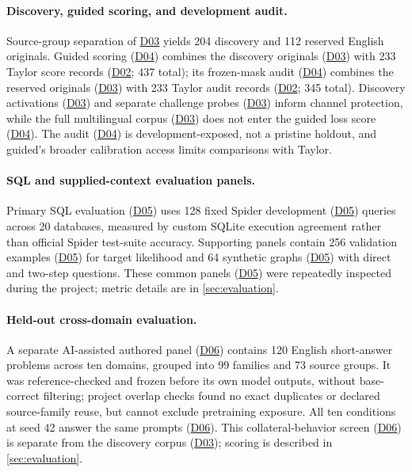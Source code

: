 \documentclass[10pt,letterpaper]{article}
\DeclareRobustCommand{\dataset}[1]{\hyperlink{dataset-#1}{\textnormal{#1}}}
\begin{document}
\paragraph{Discovery, guided scoring, and development audit.}
Source-group separation of \dataset{D03} yields 204 discovery and 112 reserved English
originals. Guided scoring (\dataset{D04}) combines the discovery originals
(\dataset{D03}) with 233 Taylor score records (\dataset{D02}; 437 total);
its frozen-mask audit (\dataset{D04}) combines the reserved originals
(\dataset{D03}) with 233 Taylor audit records (\dataset{D02}; 345 total).
Discovery activations (\dataset{D03}) and separate challenge probes
(\dataset{D03}) inform channel protection, while the full multilingual
corpus (\dataset{D03}) does not enter the guided loss score (\dataset{D04}).
The audit (\dataset{D04}) is development-exposed, not a pristine holdout, and
guided's broader calibration access limits comparisons with Taylor.

\paragraph{SQL and supplied-context evaluation panels.}
Primary SQL evaluation (\dataset{D05}) uses 128 fixed Spider development
(\dataset{D05}) queries across
20 databases, measured by custom SQLite execution agreement rather than
official Spider test-suite accuracy. Supporting panels contain 256
validation examples (\dataset{D05}) for target likelihood and 64 synthetic graphs
(\dataset{D05}) with direct and two-step questions. These common panels
(\dataset{D05}) were repeatedly
inspected during the project; metric details are in
\autoref{sec:evaluation}.

\paragraph{Held-out cross-domain evaluation.}
A separate AI-assisted authored panel (\dataset{D06}) contains 120 English short-answer
problems across ten domains, grouped into 99 families and 73 source groups.
It was reference-checked and frozen before its own model outputs, without
base-correct filtering; project overlap checks found no exact duplicates
or declared source-family reuse, but cannot exclude pretraining exposure.
All ten conditions at seed 42 answer the same prompts (\dataset{D06}).
This collateral-behavior screen (\dataset{D06}) is separate from the discovery
corpus (\dataset{D03}); scoring is described in \autoref{sec:evaluation}.
\end{document}
